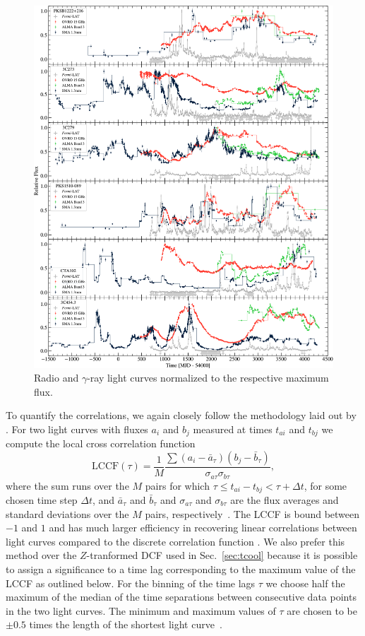 \documentclass[twocolumn,linenumbers]{aastex62}
\newcommand{\gray}{$\gamma$-ray\xspace}
\begin{document}
\begin{figure}
    \centering
    \includegraphics[width = .8\linewidth]{figures/lc_gamma_radio_tsmin9.pdf}
    \caption{Radio and \gray light curves normalized to the respective maximum flux.}
    \label{fig:lc-radio}
\end{figure}

To quantify the correlations, we again closely follow the methodology laid out by \citet{2014MNRAS.445..437M}. 
For two light curves with fluxes $a_i$ and $b_j$ 
measured at times $t_{ai}$ and $t_{bj}$ we compute the local cross correlation function
\begin{equation}
\mathrm{LCCF}(\tau) = \frac{1}{M}\frac{\sum(a_i - \bar{a}_\tau)(b_j - \bar{b}_\tau)}{\sigma_{a\tau}\sigma_{b\tau}},
\end{equation}
where the sum runs over the $M$ pairs for which $\tau \leqslant t_{ai} - t_{bj} < \tau + \Delta t$, for some chosen time step $\Delta t$, and $\bar{a}_\tau$ and $\bar{b}_\tau$ and $\sigma_{a\tau}$ and $\sigma_{b\tau}$ are the flux averages and standard deviations over the $M$ pairs, respectively~\citep{1999PASP..111.1347W}. 
The LCCF is bound between $-1$ and $1$ and has much larger efficiency in recovering linear correlations between light curves compared to the discrete correlation function \citep{2014MNRAS.445..437M}.
We also prefer this method over the $Z$-tranformed DCF used in Sec.~\ref{sec:tcool} because it is possible to assign a significance to a time lag corresponding to the maximum value of the LCCF as outlined below. 
For the binning of the time lags $\tau$ we choose half the maximum of the median of the time separations between consecutive data points in the two light curves.
The minimum and maximum values of $\tau$ are chosen to be $\pm0.5$ times the length of the shortest light curve~\citep{2014MNRAS.445..428M}.
\end{document}
